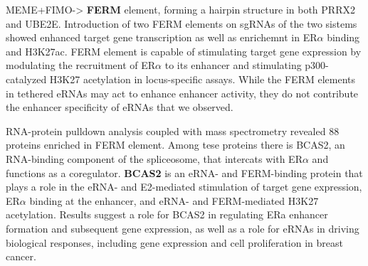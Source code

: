 MEME+FIMO-> \textbf{FERM} element, forming a hairpin structure in both PRRX2 and UBE2E. Introduction of two FERM elements on
sgRNAs of the two sistems showed enhanced target gene transcription as well as enrichemnt in ER$\alpha$ binding and H3K27ac.
FERM element is capable of stimulating target gene expression by
modulating the recruitment of ER$\alpha$ to its enhancer and stimulating
p300- catalyzed H3K27 acetylation in locus-specific assays.
While the FERM elements in tethered eRNAs may act to enhance
enhancer activity, they do not contribute the enhancer specificity of
eRNAs that we observed.

RNA-protein pulldown analysis coupled with mass spectrometry revealed 88 proteins enriched in
FERM element. Among tese proteins there is BCAS2, an RNA-binding component of the spliceosome, that
intercats with ER$\alpha$ and functions as a coregulator. \textbf{BCAS2} is an eRNA- and FERM-binding protein that plays a role in the eRNA- and
E2-mediated stimulation of target gene expression, ER$\alpha$ binding at the
enhancer, and eRNA- and FERM-mediated H3K27 acetylation.  Results suggest a role for BCAS2 in regulating ERa enhancer formation and subsequent gene expression, as well as a role for eRNAs in driving biological responses, including gene expression and
cell proliferation in breast cancer.

